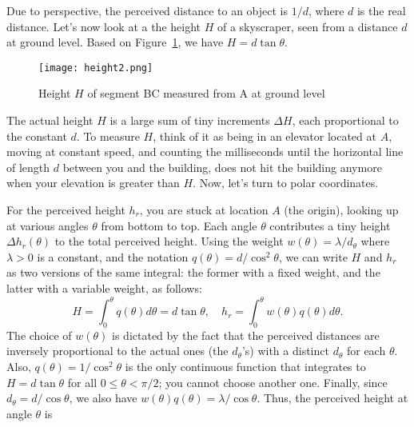 \documentclass[10pt]{article}
\begin{document}
Due to perspective, the perceived distance to an object is $1/d$, where $d$ is the real distance. Let's now look 
at a the height $H$ of a skyscraper, seen from a distance $d$ at ground level.  Based on Figure~\ref{fig:gmlp9utheight}, we have $H = d\tan \theta$. 

\begin{figure}[H]
\centering
\texttt{[image: height2.png]}
\caption{Height $H$ of segment BC measured from A at ground level}
\label{fig:gmlp9utheight}
\end{figure}

\noindent The actual height $H$ is a large sum of tiny increments $\Delta H$, each proportional to the constant $d$. To measure $H$, think of it as being in an elevator located at $A$, moving at constant speed, and counting the milliseconds until the horizontal line of length $d$ between you and the building, does not hit the building anymore when your elevation is greater than $H$. Now, let's turn to polar coordinates.

For the perceived height $h_r$, you are stuck at location $A$ (the origin), looking up at various angles $\theta$ from bottom to top. Each angle $\theta$ contributes a tiny height $\Delta h_r(\theta)$ to the total perceived height. Using the weight $w(\theta) = \lambda / d_\theta$ where $\lambda > 0$ is a constant, and the notation
$q(\theta) = d/\cos^2\theta$, we can write $H$ and $h_r$ as two versions of the same integral: the former with a fixed weight, and the latter with a variable weight, as follows:
$$
H  = \int_0^\theta q(\theta) d\theta = d\tan\theta, \quad 
h_r  = \int_0^\theta w(\theta)q(\theta) d\theta.
$$
The choice of $w(\theta)$ is dictated by the fact that the perceived distances are inversely  
proportional to the actual ones (the $d_\theta$'s) with a distinct $d_\theta$ for each $\theta$. 
Also, $q(\theta)=1/\cos^2\theta$ is the only continuous function that integrates to $H=d\tan\theta$ for all
$0\leq\theta<\pi/2$; you cannot choose another one.
Finally, since $d_\theta = d/\cos\theta$, we also have $w(\theta)q(\theta) = \lambda/\cos \theta$. Thus, the perceived
 height at angle $\theta$ is 
\end{document}
